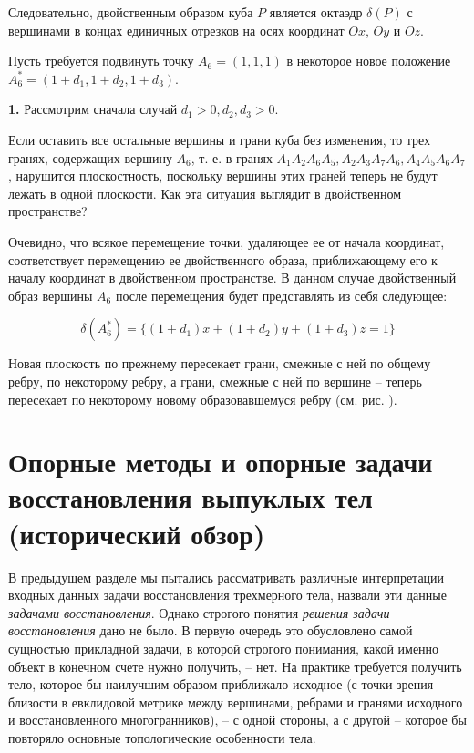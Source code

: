 \documentclass[a4paper, 12pt, titlepage]{article}
\theoremstyle{definition}
\theoremstyle{plain}
\theoremstyle{plain}
\begin{document}
Следовательно, двойственным образом куба $P$ является октаэдр $\delta(P)$ с
вершинами в концах единичных отрезков на осях координат $Ox$, $Oy$ и $Oz$.


Пусть требуется подвинуть точку $A_{6} = (1, 1, 1)$ в некоторое новое положение
$A_{6}^{*} = (1 + d_{1}, 1 + d_{2}, 1 + d_{3})$.

\textbf{1. } Рассмотрим сначала случай $d_{1} > 0, d_{2}, d_{3} > 0$.

Если оставить все остальные вершины и грани куба без изменения, то трех гранях,
содержащих вершину $A_{6}$, т. е. в гранях
$A_{1} A_{2} A_{6} A_{5}, A_{2} A_{3} A_{7} A_{6}, A_{4} A_{5} A_{6} A_{7}$,
нарушится плоскостность, поскольку вершины этих граней теперь не будут лежать в
одной плоскости. Как эта ситуация выглядит в двойственном пространстве?

Очевидно, что всякое перемещение точки, удаляющее ее от начала координат,
соответствует перемещению ее двойственного образа, приближающему его к началу
координат в двойственном пространстве. В данном случае двойственный образ
вершины $A_{6}$ после перемещения будет представлять из себя следующее:

\begin{equation*}
 \delta(A_{6}^{*}) = \{ (1 + d_{1}) x + (1 + d_{2}) y + (1 + d_{3}) z = 1 \}
\end{equation*}

Новая плоскость по прежнему пересекает грани, смежные с ней по общему ребру, по
некоторому ребру, а грани, смежные с ней по вершине -- теперь пересекает по
некоторому новому образовавшемуся ребру (см. рис. ).


\newpage
\section{Опорные методы и опорные задачи восстановления выпуклых
тел (исторический обзор)}
\label{sec:support-methods}

В предыдущем разделе мы пытались рассматривать различные интерпретации входных
данных задачи восстановления трехмерного тела, назвали эти данные
\textit{задачами восстановления}. Однако строгого понятия \textit{решения
задачи восстановления} дано не было. В первую очередь это обусловлено самой
сущностью прикладной задачи, в которой строгого понимания, какой именно объект
в конечном счете нужно получить, -- нет. На практике требуется получить
тело, которое бы наилучшим образом приближало исходное (с точки зрения
близости в евклидовой метрике между вершинами, ребрами и гранями исходного и
восстановленного многогранников), -- с одной стороны, а с другой -- которое бы
повторяло основные топологические особенности тела.
\end{document}
